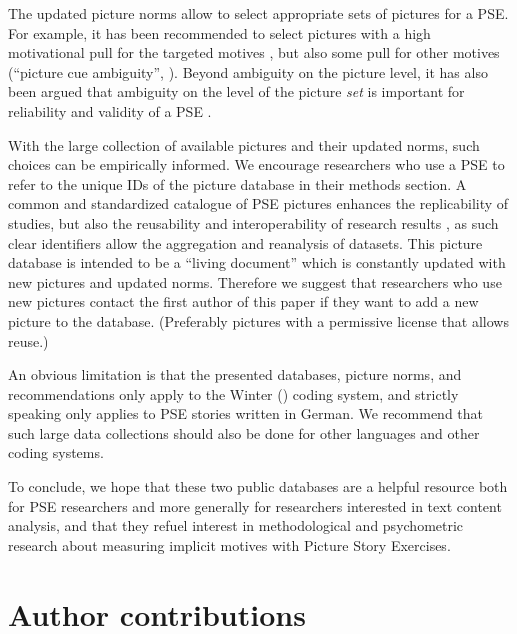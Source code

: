 \documentclass[man,a4paper,mask]{apa6}\usepackage[]{graphicx}\usepackage[]{color}
\begin{document}
The updated picture norms allow to select appropriate sets of pictures for a PSE. For example, it has been recommended to select pictures with a high motivational pull for the targeted motives \parencite{schultheiss_MeasuringImplicitMotives_2007,smith_MethodologicalConsiderationsSteps_1992}, but also some pull for other motives (``picture cue ambiguity'', ). Beyond ambiguity on the picture level, it has also been argued that ambiguity on the level of the picture \emph{set} is important for reliability and validity of a PSE \parencite{ramsay_SetAmbiguityKey_2013}. 

With the large collection of available pictures and their updated norms, such choices can be empirically informed. We encourage researchers who use a PSE to refer to the unique IDs of the picture database in their methods section. A common and standardized catalogue of PSE pictures enhances the replicability of studies, but also the reusability and interoperability of research results \parencite{wilkinson_FAIRGuidingPrinciples_2016}, as such clear identifiers allow the aggregation and reanalysis of datasets. 
This picture database is intended to be a ``living document'' which is constantly updated with new pictures and updated norms. Therefore we suggest that researchers who use new pictures contact the first author of this paper if they want to add a new picture to the database. (Preferably pictures with a permissive license that allows reuse.) 

An obvious limitation is that the presented databases, picture norms, and recommendations only apply to the Winter (\citeyear{winter_ManualScoringMotive_1994}) coding system, and strictly speaking only applies to PSE stories written in German. We recommend that such large data collections should also be done for other languages and other coding systems.

To conclude, we hope that these two public databases are a helpful resource both for PSE researchers and more generally for researchers interested in text content analysis, and that they refuel interest in methodological and psychometric research about measuring implicit motives with Picture Story Exercises.

\section{Author contributions}
\end{document}
